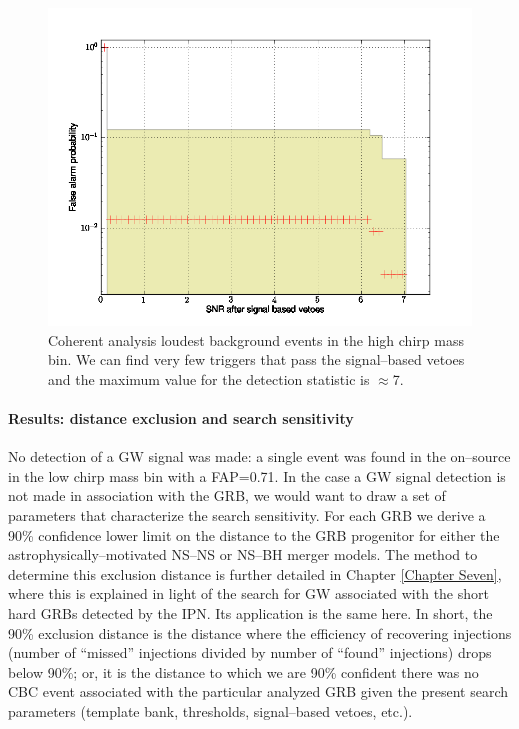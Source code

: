 \begin{figure}[ht]
\centering
\includegraphics[scale=0.60]{Images/cohBG.png}
\caption{Coherent analysis loudest background events in the high chirp mass bin. We can find very few triggers that pass the signal--based vetoes and the maximum value for the detection statistic is $\approx$7.}
\label{cohBG}
\end{figure}

\paragraph{Results: distance exclusion and search sensitivity}
No detection of a GW signal was made: a single event was found in the on--source in the low chirp mass bin with a FAP=0.71. In the case a GW signal detection is not made in association with the GRB, we would want to draw a set of parameters that characterize the search sensitivity. For each GRB we derive a 90\% confidence lower limit on the distance to the GRB progenitor for either the astrophysically--motivated NS--NS or NS--BH merger models. The method to determine this exclusion distance is further detailed in Chapter \ref{Chapter Seven}, where this is explained in light of the search for GW associated with the short hard GRBs detected by the IPN. Its application is the same here. In short, the 90\% exclusion distance is the distance where the efficiency of recovering injections (number of ``missed'' injections divided by number of ``found'' injections) drops below 90\%; or, it is the distance to which we are 90\% confident there was no CBC event associated with the particular analyzed GRB given the present search parameters (template bank, thresholds, signal--based vetoes, etc.). 

